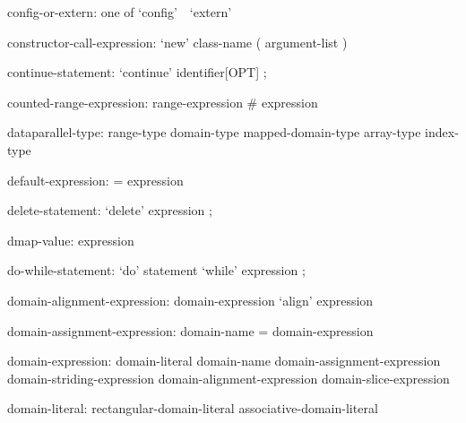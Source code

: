\begin{syntax}
config-or-extern: one of
  `config' $ $ $ $ `extern'
\end{syntax}

\begin{syntax}
constructor-call-expression:
  `new' class-name ( argument-list )
\end{syntax}

\begin{syntax}
continue-statement:
  `continue' identifier[OPT] ;
\end{syntax}

\begin{syntax}
counted-range-expression:
  range-expression # expression
\end{syntax}

\begin{syntax}
dataparallel-type:
  range-type
  domain-type
  mapped-domain-type
  array-type
  index-type
\end{syntax}

\begin{syntax}
default-expression:
  = expression
\end{syntax}

\begin{syntax}
delete-statement:
  `delete' expression ;
\end{syntax}

\begin{syntax}
dmap-value:
  expression
\end{syntax}

\begin{syntax}
do-while-statement:
  `do' statement `while' expression ;
\end{syntax}

\begin{syntax}
domain-alignment-expression:
  domain-expression `align' expression
\end{syntax}

\begin{syntax}
domain-assignment-expression:
  domain-name = domain-expression
\end{syntax}

\begin{syntax}
domain-expression:
  domain-literal
  domain-name
  domain-assignment-expression
  domain-striding-expression
  domain-alignment-expression
  domain-slice-expression
\end{syntax}

\begin{syntax}
domain-literal:
  rectangular-domain-literal
  associative-domain-literal
\end{syntax}

